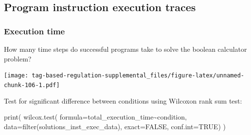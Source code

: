 \documentclass[
]{book}
\newenvironment{Shaded}{\begin{snugshade}}{\end{snugshade}}
\newcommand{\AttributeTok}[1]{\textcolor[rgb]{0.77,0.63,0.00}{#1}}
\newcommand{\CommentTok}[1]{\textcolor[rgb]{0.56,0.35,0.01}{\textit{#1}}}
\newcommand{\ConstantTok}[1]{\textcolor[rgb]{0.00,0.00,0.00}{#1}}
\newcommand{\FloatTok}[1]{\textcolor[rgb]{0.00,0.00,0.81}{#1}}
\newcommand{\FunctionTok}[1]{\textcolor[rgb]{0.00,0.00,0.00}{#1}}
\newcommand{\NormalTok}[1]{#1}
\newcommand{\OtherTok}[1]{\textcolor[rgb]{0.56,0.35,0.01}{#1}}
\newcommand{\SpecialCharTok}[1]{\textcolor[rgb]{0.00,0.00,0.00}{#1}}
\newcommand{\StringTok}[1]{\textcolor[rgb]{0.31,0.60,0.02}{#1}}
\begin{document}
\hypertarget{program-instruction-execution-traces-3}{%
\subsection{Program instruction execution traces}\label{program-instruction-execution-traces-3}}

\hypertarget{execution-time-3}{%
\subsubsection{Execution time}\label{execution-time-3}}

How many time steps do successful programs take to solve the boolean calculator problem?

\begin{Shaded}
\end{Shaded}

\texttt{[image: tag-based-regulation-supplemental\_files/figure-latex/unnamed-chunk-106-1.pdf]}

Test for significant difference between conditions using Wilcoxon rank sum test:

\begin{Shaded}
\begin{Highlighting}[]
\FunctionTok{print}\NormalTok{(}
  \FunctionTok{wilcox.test}\NormalTok{(}
    \AttributeTok{formula=}\NormalTok{total\_execution\_time}\SpecialCharTok{\textasciitilde{}}\NormalTok{condition,}
    \AttributeTok{data=}\FunctionTok{filter}\NormalTok{(solutions\_inst\_exec\_data),}
    \AttributeTok{exact=}\ConstantTok{FALSE}\NormalTok{,}
    \AttributeTok{conf.int=}\ConstantTok{TRUE}\NormalTok{)}
\NormalTok{)}
\end{Highlighting}
\end{Shaded}
\end{document}
